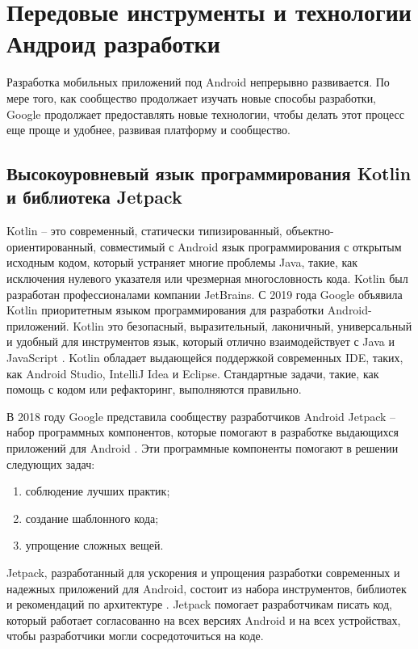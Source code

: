 \chapter{Передовые инструменты и технологии Андроид разработки}

Разработка мобильных приложений под Android непрерывно развивается. По мере того, как сообщество продолжает изучать новые способы разработки, Google продолжает предоставлять новые технологии, чтобы делать этот процесс еще проще и удобнее, развивая платформу и сообщество. 


\section{Высокоуровневый язык программирования Kotlin и библиотека Jetpack}

Kotlin -- это современный, статически типизированный, объектно-ориентированный, совместимый с Android язык программирования с открытым исходным кодом, который устраняет многие проблемы Java, такие, как исключения нулевого указателя или чрезмерная многословность кода. Kotlin был разработан профессионалами компании JetBrains. С 2019 года Google объявила Kotlin приоритетным языком программирования для разработки Android-приложений. Kotlin это безопасный, выразительный, лаконичный, универсальный и удобный для инструментов язык, который отлично взаимодействует с Java и JavaScript \cite{7}. Kotlin обладает выдающейся поддержкой современных IDE, таких, как Android Studio, IntelliJ Idea и Eclipse. Стандартные задачи, такие, как помощь с кодом или рефакторинг, выполняются правильно. 

В 2018 году Google представила сообществу разработчиков Android Jetpack -- набор программных компонентов, которые помогают в разработке выдающихся приложений для Android \cite{Kotlin4}. Эти программные компоненты помогают в решении следующих задач:
\begin{enumerate}
    \item соблюдение лучших практик;
    \item создание шаблонного кода;
    \item упрощение сложных вещей.
\end{enumerate}

Jetpack, разработанный для ускорения и упрощения разработки современных и надежных приложений для Android, состоит из набора инструментов, библиотек и рекомендаций по архитектуре \cite{8}. Jetpack помогает разработчикам писать код, который работает согласованно на всех версиях Android и на всех устройствах, чтобы разработчики могли сосредоточиться на коде.

